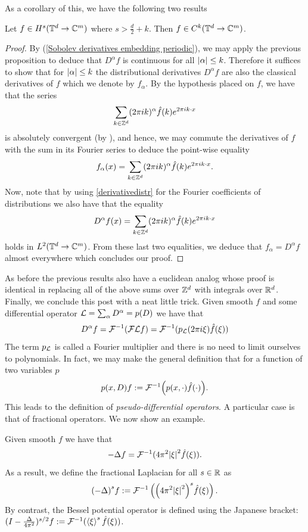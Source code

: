 \documentclass[
    a4paper,
    DIV=14,
    abstract=true,
    numbers=noenddot
]{scrartcl}
\begin{document}
As a corollary of this, we have the following two results
\begin{proposition}\label{characterization smooth functions in Sobolev space}
	Let $f\in H^s(\mathbb{T}^d\to\mathbb{C}^m)$ where $s>\frac{d}{2}+k$. Then   $f\in C^k(\mathbb{T}^d\to\mathbb{C}^m)$.
\end{proposition}
\begin{proof}
	By (\ref{Sobolev derivatives embedding periodic}),
	we may apply the previous proposition to deduce that $D^\alpha f$ is continuous for all ${\left| \alpha \right|}\leq k$. Therefore it suffices to show that for ${\left| \alpha \right|}\leq k$ the distributional derivatives $D^\alpha f$ are also the classical derivatives of $f$ which we denote by $f_\alpha$.\bigbreak
	By the hypothesis placed on $f$, we have that the series
	\[\sum_{k\in\mathbb{Z}^d} (2\pi ik)^\alpha \hat{f}(k)e^{2\pi ik\cdot x} \]
	is absolutely convergent (by ), and hence, we may commute the derivatives of $f$ with the sum in its Fourier series to deduce the point-wise equality
	\[f_\alpha(x)=\sum_{k\in\mathbb{Z}^d} (2\pi ik)^\alpha \hat{f}(k)e^{2\pi ik\cdot x}.\]
	Now, note that by using \eqref{derivativedistr} for the Fourier coefficients of distributions we also have that the equality
	\[D^\alpha f(x)=\sum_{k\in\mathbb{Z}^d} (2\pi ik)^\alpha \hat{f}(k)e^{2\pi ik\cdot x}\]
	holds in $ L^2(\mathbb{T}^d\to\mathbb{C}^m)$. From these last two equalities, we deduce that $f_\alpha=D^\alpha f$ almost everywhere which concludes our proof.
\end{proof}
As before the previous results also have a euclidean analog whose proof is identical in replacing all of the above sums over $\mathbb{Z}^d$ with integrals over $\mathbb{R}^d$.
Finally, we conclude this post with a neat little trick. Given smooth $f$ and some differential operator $\mathcal{L} =\sum_{\alpha} D^\alpha=p(D)$ we have that
\begin{equation*}
	D^\alpha f =\mathcal{F}^{-1}(\mathcal{F}  \mathcal{L} f)=\mathcal{F}^{-1}(p_{\mathcal{L}}(2 \pi i\xi )\hat{f}(\xi ))
\end{equation*}
The term $p_{\mathcal{L}}$ is called a Fourier multiplier and there is no need to limit ourselves to polynomials. In fact, we may make the general definition that for a function of two variables $p$
\begin{equation*}
	p(x,D)f:=\mathcal{F}^{-1}\qty(p(x,\cdot  )\hat{f}(\cdot  )).
\end{equation*}
This leads to the definition of \emph{pseudo-differential operators}. A particular case is that of fractional operators. We now show an example.
\begin{example}
Given smooth $f$ we have that
\begin{equation*}
-\Delta f=\mathcal{F}^{-1}(4 \pi^2 {\left| \xi \right|}^2 \hat{f}(\xi )).
\end{equation*}
As a result, we define the fractional Laplacian for all $s\in \mathbb{R}$ as
\begin{equation*}
{(-\Delta)}^sf:=\mathcal{F}^{-1} \left(\qty(4\pi^2 {\left| \xi  \right|}^2)^s\hat{f}(\xi )\right).
\end{equation*}
By contrast, the Bessel potential operator is defined using the Japanese bracket: $(I - \frac{\Delta}{4\pi^2})^{s/2}f := \mathcal{F}^{-1}(\left\langle\xi\right\rangle^s \hat{f}(\xi))$.
\end{example}
\end{document}
